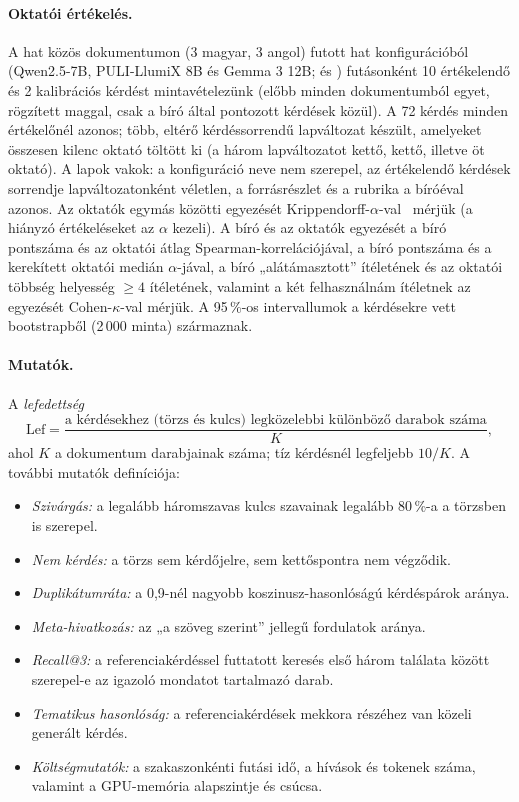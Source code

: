 \paragraph{Oktatói értékelés.}\label{app-oktatoi} A hat közös dokumentumon (3 magyar, 3 angol) futott hat
konfigurációból (Qwen2.5-7B, PULI-LlumiX 8B és Gemma 3 12B;  és ) futásonként 10
értékelendő és 2 kalibrációs kérdést mintavételezünk (előbb minden dokumentumból egyet, rögzített maggal, csak
a bíró által pontozott kérdések közül). A 72 kérdés minden értékelőnél azonos; több, eltérő kérdéssorrendű lapváltozat
készült, amelyeket összesen kilenc oktató töltött ki (a három lapváltozatot kettő, kettő, illetve öt
oktató). A lapok vakok: a
konfiguráció neve nem szerepel, az értékelendő kérdések sorrendje lapváltozatonként véletlen, a forrásrészlet
és a rubrika a bíróéval azonos. Az oktatók egymás közötti egyezését Krippendorff-$\alpha$-val~\cite{krippendorff2004}
mérjük (a hiányzó értékeléseket az $\alpha$ kezeli). A bíró és az oktatók egyezését a bíró pontszáma és az
oktatói átlag Spearman-korrelációjával, a bíró pontszáma és a kerekített oktatói medián $\alpha$-jával, a bíró
„alátámasztott” ítéletének és az oktatói többség helyesség $\ge 4$ ítéletének, valamint a két felhasználnám
ítéletnek az egyezését Cohen-$\kappa$-val mérjük. A 95\,\%-os intervallumok a kérdésekre vett bootstrapből
(2\,000 minta) származnak.

\paragraph{Mutatók.}\label{app-mutatok} A \emph{lefedettség}
\begin{equation}
\mathrm{Lef}=\frac{\text{a kérdésekhez (törzs és kulcs) legközelebbi különböző darabok száma}}{K},
\label{eq:cov}
\end{equation}
ahol $K$ a dokumentum darabjainak száma; tíz kérdésnél legfeljebb $10/K$. A további mutatók definíciója:
\begin{itemize}[leftmargin=*,itemsep=1pt,topsep=2pt]
\item \emph{Szivárgás:} a legalább háromszavas kulcs szavainak legalább 80\,\%-a a törzsben is szerepel.
\item \emph{Nem kérdés:} a törzs sem kérdőjelre, sem kettőspontra nem végződik.
\item \emph{Duplikátumráta:} a 0,9-nél nagyobb koszinusz-hasonlóságú kérdéspárok aránya.
\item \emph{Meta-hivatkozás:} az „a szöveg szerint” jellegű fordulatok aránya.
\item \emph{Recall@3:} a referenciakérdéssel futtatott keresés első három találata között szerepel-e az igazoló mondatot tartalmazó darab.
\item \emph{Tematikus hasonlóság:} a referenciakérdések mekkora részéhez van közeli generált kérdés.
\item \emph{Költségmutatók:} a szakaszonkénti futási idő, a hívások és tokenek száma, valamint a GPU-memória alapszintje és csúcsa.
\end{itemize}

